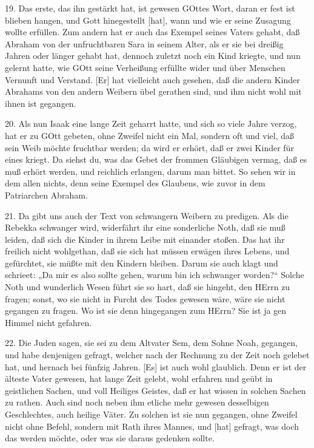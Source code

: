 19. Das erste, das ihn gestärkt hat, ist gewesen GOttes Wort, daran er fest ist blieben hangen, und Gott hinegestellt [hat], wann und wie er seine Zusagung wollte erfüllen. Zum andern hat er auch das Exempel seines Vaters gehabt, daß Abraham von der unfruchtbaren Sara in seinem Alter, als er sie bei dreißig Jahren oder länger gehabt hat, dennoch zuletzt noch ein Kind kriegte, und nun gelernt hatte, wie GOtt seine Verheißung erfüllte wider und über Menschen Vernunft und Verstand. [Er] hat vielleicht auch gesehen, daß die andern Kinder Abrahams von den andern Weibern übel gerathen sind, und ihm nicht wohl mit ihnen ist gegangen.

20. Als nun Isaak eine lange Zeit geharrt hatte, und sich so viele Jahre verzog, hat er zu GOtt gebeten, ohne Zweifel nicht ein Mal, sondern oft und viel, daß sein Weib möchte fruchtbar werden; da wird er erhört, daß er zwei Kinder für eines kriegt. Da siehst du, was das Gebet der frommen Gläubigen vermag, daß es muß erhört werden, und reichlich erlangen, darum man bittet. So sehen wir in dem allen nichts, denn seine Exempel des Glaubens, wie zuvor in dem Patriarchen Abraham.

21. Da gibt uns auch der Text von schwangern Weibern zu predigen. Als die Rebekka schwanger wird, widerfährt ihr eine sonderliche Noth, daß sie muß leiden, daß sich die Kinder in ihrem Leibe mit einander stoßen. Das hat ihr freilich nicht wohlgethan, daß sie sich hat müssen erwägen ihres Lebens, und gefürchtet, sie müßte mit den Kindern bleiben. Darum sie auch klagt und schrieet: „Da mir es also sollte gehen, warum bin ich schwanger worden?“ Solche Noth und wunderlich Wesen führt sie so hart, daß sie hingeht, den HErrn zu fragen; sonst, wo sie nicht in Furcht des Todes gewesen wäre, wäre sie nicht gegangen zu fragen. Wo ist sie denn hingegangen zum HErrn? Sie ist ja gen Himmel nicht gefahren.

22. Die Juden sagen, sie sei zu dem Altvater Sem, dem Sohne Noah, gegangen, und habe
denjenigen gefragt, welcher nach der Rechnung zu der Zeit noch gelebet hat, und hernach bei fünfzig Jahren. [Es] ist auch wohl glaublich. Denn er ist der älteste Vater gewesen, hat lange Zeit gelebt, wohl erfahren und geübt in geistlichen Sachen, und voll Heiliges Geistes, daß er hat wissen in solchen Sachen zu rathen. Auch sind noch neben ihm etliche mehr gewesen desselbigen Geschlechtes, auch heilige Väter. Zu solchen ist sie nun gegangen, ohne Zweifel nicht ohne Befehl, sondern mit Rath ihres Mannes, und [hat] gefragt, was doch das werden möchte, oder was sie daraus gedenken sollte.

